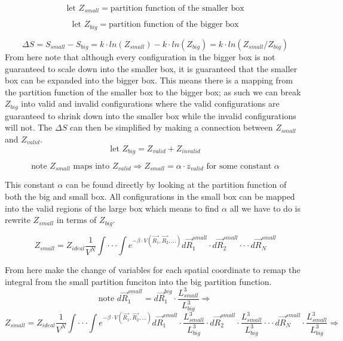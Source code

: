 \begin{equation}\label{eq:MCHS9}
\text{let }Z_{small}=\text{partition function of the smaller box}
\end{equation}

\begin{equation}\label{eq:MCHS10}
\text{let }Z_{big}=\text{partition function of the bigger box}
\end{equation}

\begin{equation}\label{eq:MCHS11}
\Delta S=S_{small}-S_{big}=k\cdot ln(Z_{small})-k\cdot ln(Z_{big})=k\cdot ln(Z_{small}/Z_{big})
\end{equation}
From here note that although every configuration in the bigger box is not guaranteed to scale down into the smaller box, it is guaranteed that the smaller box can be expanded into the bigger box. This means there is a mapping from the partition function of the smaller box to the bigger box; as such we can break $Z_{big}$ into valid and invalid configurations where the valid configurations are guaranteed to shrink down into the smaller box while the invalid configurations will not. The $\Delta S$ can then be simplified by making a connection between $Z_{small}$ and $Z_{valid}$.
\begin{equation}\label{eq:MCHS12}
\text{let }Z_{big}=Z_{valid}+Z_{invalid}
\end{equation}

\begin{equation}\label{eq:MCHS13}
\text{note }Z_{small}\text{ maps into }Z_{valid} \Rightarrow Z_{small}=\alpha\cdot z_{valid}\text{ for some constant } \alpha
\end{equation}

This constant $\alpha$ can be found directly by looking at the partition function of both the big and small box. All configurations in the small box can be mapped into the valid regions of the large box which means to find $\alpha$ all we have to do is rewrite $Z_{small}$ in terms of $Z_{big}$.

\begin{equation}\label{eq:MCHS14}
Z_{small}=Z_{ideal}\frac{1}{V^N}\int\cdot\cdot\cdot\int e^{-\beta\cdot V(\vec{R_1},\vec{R_2},...)}d\vec{R}_1^{small}\cdot d\vec{R}_2^{small}\cdot\cdot\cdot d\vec{R}_N^{small}
\end{equation}

From here make the change of variables for each spatial coordinate to remap the integral from the small partition funciton into the big partition function.
\begin{equation}\label{eq:MCHS15}
\text{note }d\vec{R}_1^{small}=d\vec{R}_1^{big}\cdot \frac{L_{small}^3}{L_{big}^3}\Rightarrow
\end{equation}
\begin{equation}\label{eq:MCHS16}
Z_{small}=Z_{ideal}\frac{1}{V^N}\int\cdot\cdot\cdot\int e^{-\beta\cdot V(\vec{R_1},\vec{R_2},...)}d\vec{R}_1^{small}\cdot \frac{L_{small}^3}{L_{big}^3}\cdot d\vec{R}_2^{small}\cdot \frac{L_{small}^3}{L_{big}^3}\cdot\cdot\cdot d\vec{R}_N^{small}\cdot \frac{L_{small}^3}{L_{big}^3}\Rightarrow
\end{equation}

